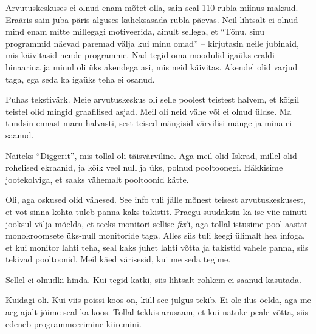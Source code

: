 
Arvutuskeskuses ei olnud enam mõtet olla, sain seal 110 rubla miinus maksud. 
Eraäris sain juba päris alguses kaheksasada rubla päevas. Neil lihtsalt ei 
olnud mind enam mitte millegagi motiveerida, ainult 
sellega, et \enquote{Tõnu, sinu programmid näevad paremad välja kui minu omad} -- 
kirjutasin neile jubinaid, mis käivitasid nende programme. 
Nad tegid oma moodulid igaüks eraldi binaarina ja minul oli üks
akendega asi, mis neid käivitas. Akendel olid varjud taga, ega seda ka igaüks 
teha ei osanud. 


Puhas tekstivärk. Meie arvutuskeskus oli selle poolest teistest halvem, et kõigil teistel olid mingid graafilised asjad. Meil oli neid vähe 
või ei olnud üldse. Ma tundsin ennast maru halvasti, sest teised mängisid 
värvilisi mänge ja mina ei saanud. 


Näiteks \enquote{Diggerit}, mis tollal 
oli täisvärviline. Aga meil olid Iskrad, millel olid rohelised 
ekraanid, ja kõik veel null ja üks, polnud pooltoonegi. 
Häkkisime jootekolviga, et saaks vähemalt pooltoonid kätte. 


Oli, aga oskused olid vähesed. See info tuli jälle mõnest teisest 
arvutuskeskusest, et vot sinna kohta tuleb panna kaks takistit. Praegu 
suudaksin ka ise viie minuti jooksul välja 
mõelda, et teeks monitori sellise \emph{fix}'i, aga tollal istusime
pool aastat monokroomsete üks-null monitoride taga. 
Alles siis tuli keegi ülimalt hea infoga, et kui monitor lahti teha, seal 
kaks juhet lahti võtta ja takistid vahele panna, siis tekivad pooltoonid. Meil käed 
värisesid, kui me seda tegime. 


Sellel ei olnudki hinda. Kui tegid katki, siis lihtsalt rohkem ei saanud kasutada.


Kuidagi oli. Kui viis poissi koos on, küll see julgus tekib. Ei ole ilus 
öelda, aga me aeg-ajalt jõime seal ka koos. Tollal tekkis 
arusaam, et kui natuke peale võtta, siis edeneb programmeerimine 
kiiremini. 

